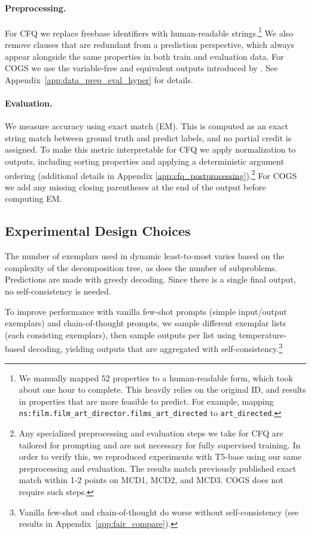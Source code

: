 \documentclass{article} \usepackage{iclr2022_conference,times}
\begin{document}
\paragraph{Preprocessing.} For CFQ we replace freebase identifiers with human-readable strings.\footnote{We manually mapped 52 properties to a human-readable form, which took about one hour to complete. This heavily relies on the original ID, and results in properties that are more feasible to predict. For example, mapping \texttt{ns:film.film\_art\_director.films\_art\_directed} to \texttt{art\_directed}.} We also remove clauses that are redundant from a prediction perspective, which always appear alongside the same properties in both train and evaluation data. For COGS we use the variable-free and equivalent outputs introduced by \cite{qiu-etal-2022-improving}. See Appendix~\ref{app:data_prep_eval_hyper} for details.

\paragraph{Evaluation.} We measure accuracy using exact match (EM). This is computed as an exact string match between ground truth and predict labels, and no partial credit is assigned. To make this metric interpretable for CFQ we apply normalization to outputs, including sorting properties and applying a deterministic argument ordering (additional details in Appendix \ref{app:cfq_postprocessing}).\footnote{Any specialized preprocessing and evaluation steps we take for CFQ are tailored for prompting and are not necessary for fully supervised training. In order to verify this, we reproduced experiments with T5-base using our same preprocessing and evaluation. The results match previously published exact match within 1-2 points on MCD1, MCD2, and MCD3. COGS does not require such steps.} For COGS we add any missing closing parentheses at the end of the output before computing EM.

\subsection{Experimental Design Choices \label{sec:modeling}}


The number of exemplars used in dynamic least-to-most varies  based on the complexity of the decomposition tree, as does the number of subproblems. Predictions are made with greedy decoding. Since there is a single final output, no self-consistency is needed.

To improve performance with vanilla few-shot prompts (simple input/output exemplars) and chain-of-thought prompts, we sample  different exemplar lists (each consisting  exemplars), then sample  outputs per list using temperature-based decoding, yielding  outputs that are aggregated with self-consistency.\footnote{Vanilla few-shot and chain-of-thought do worse without self-consistency (see results in Appendix~\ref{app:fair_compare}).}
\end{document}
